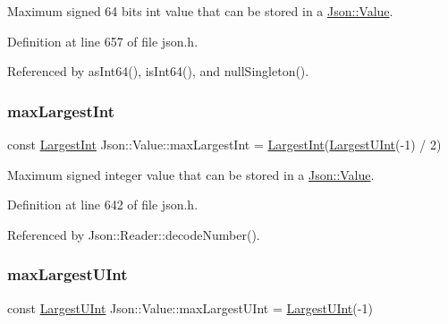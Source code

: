 Maximum signed 64 bits int value that can be stored in a \hyperlink{class_json_1_1_value}{Json\+::\+Value}. 



Definition at line 657 of file json.\+h.



Referenced by as\+Int64(), is\+Int64(), and null\+Singleton().

\mbox{\label{class_json_1_1_value_a8b4977696f13296fa8755c7953fafb2f}} 
\subsubsection{\texorpdfstring{max\+Largest\+Int}{maxLargestInt}}
{\footnotesize\ttfamily const \hyperlink{class_json_1_1_value_a1cbb82642ed05109b9833e49f042ece7}{Largest\+Int} Json\+::\+Value\+::max\+Largest\+Int = \hyperlink{class_json_1_1_value_a1cbb82642ed05109b9833e49f042ece7}{Largest\+Int}(\hyperlink{class_json_1_1_value_a6682a3684d635e03fc06ba229fa24eec}{Largest\+U\+Int}(-\/1) / 2)\hspace{0.3cm}{\ttfamily [static]}}



Maximum signed integer value that can be stored in a \hyperlink{class_json_1_1_value}{Json\+::\+Value}. 



Definition at line 642 of file json.\+h.



Referenced by Json\+::\+Reader\+::decode\+Number().

\mbox{\label{class_json_1_1_value_a8ddb32d9d55fa5323ae5135639dc2e31}} 
\subsubsection{\texorpdfstring{max\+Largest\+U\+Int}{maxLargestUInt}}
{\footnotesize\ttfamily const \hyperlink{class_json_1_1_value_a6682a3684d635e03fc06ba229fa24eec}{Largest\+U\+Int} Json\+::\+Value\+::max\+Largest\+U\+Int = \hyperlink{class_json_1_1_value_a6682a3684d635e03fc06ba229fa24eec}{Largest\+U\+Int}(-\/1)\hspace{0.3cm}{\ttfamily [static]}}



